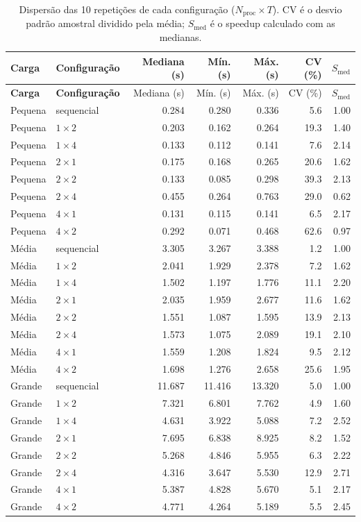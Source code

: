\documentclass[11pt,a4paper]{article}
\begin{document}
{\small
\begin{longtable}{llrrrrr}
\caption{Dispersão das 10 repetições de cada configuração ($N_{\mathrm{proc}}\times T$). CV é o desvio padrão amostral dividido pela média; $S_{\mathrm{med}}$ é o speedup calculado com as medianas.}\label{tab:dispersao}\\
\toprule
\textbf{Carga} & \textbf{Configuração} & Mediana (s) & Mín. (s) & Máx. (s) & CV (\%) & $S_{\mathrm{med}}$ \\
\midrule
\endfirsthead
\toprule
\textbf{Carga} & \textbf{Configuração} & Mediana (s) & Mín. (s) & Máx. (s) & CV (\%) & $S_{\mathrm{med}}$ \\
\midrule
\endhead
\bottomrule
\endfoot
Pequena & sequencial & 0.284 & 0.280 & 0.336 & 5.6 & 1.00 \\
Pequena & $1\times2$ & 0.203 & 0.162 & 0.264 & 19.3 & 1.40 \\
Pequena & $1\times4$ & 0.133 & 0.112 & 0.141 & 7.6 & 2.14 \\
Pequena & $2\times1$ & 0.175 & 0.168 & 0.265 & 20.6 & 1.62 \\
Pequena & $2\times2$ & 0.133 & 0.085 & 0.298 & 39.3 & 2.13 \\
Pequena & $2\times4$ & 0.455 & 0.264 & 0.763 & 29.0 & 0.62 \\
Pequena & $4\times1$ & 0.131 & 0.115 & 0.141 & 6.5 & 2.17 \\
Pequena & $4\times2$ & 0.292 & 0.071 & 0.468 & 62.6 & 0.97 \\
\midrule
Média & sequencial & 3.305 & 3.267 & 3.388 & 1.2 & 1.00 \\
Média & $1\times2$ & 2.041 & 1.929 & 2.378 & 7.2 & 1.62 \\
Média & $1\times4$ & 1.502 & 1.197 & 1.776 & 11.1 & 2.20 \\
Média & $2\times1$ & 2.035 & 1.959 & 2.677 & 11.6 & 1.62 \\
Média & $2\times2$ & 1.551 & 1.087 & 1.595 & 13.9 & 2.13 \\
Média & $2\times4$ & 1.573 & 1.075 & 2.089 & 19.1 & 2.10 \\
Média & $4\times1$ & 1.559 & 1.208 & 1.824 & 9.5 & 2.12 \\
Média & $4\times2$ & 1.698 & 1.276 & 2.658 & 25.6 & 1.95 \\
\midrule
Grande & sequencial & 11.687 & 11.416 & 13.320 & 5.0 & 1.00 \\
Grande & $1\times2$ & 7.321 & 6.801 & 7.762 & 4.9 & 1.60 \\
Grande & $1\times4$ & 4.631 & 3.922 & 5.088 & 7.2 & 2.52 \\
Grande & $2\times1$ & 7.695 & 6.838 & 8.925 & 8.2 & 1.52 \\
Grande & $2\times2$ & 5.268 & 4.846 & 5.955 & 6.3 & 2.22 \\
Grande & $2\times4$ & 4.316 & 3.647 & 5.530 & 12.9 & 2.71 \\
Grande & $4\times1$ & 5.387 & 4.828 & 5.670 & 5.1 & 2.17 \\
Grande & $4\times2$ & 4.771 & 4.264 & 5.189 & 5.5 & 2.45 \\
\end{longtable}}
\end{document}
